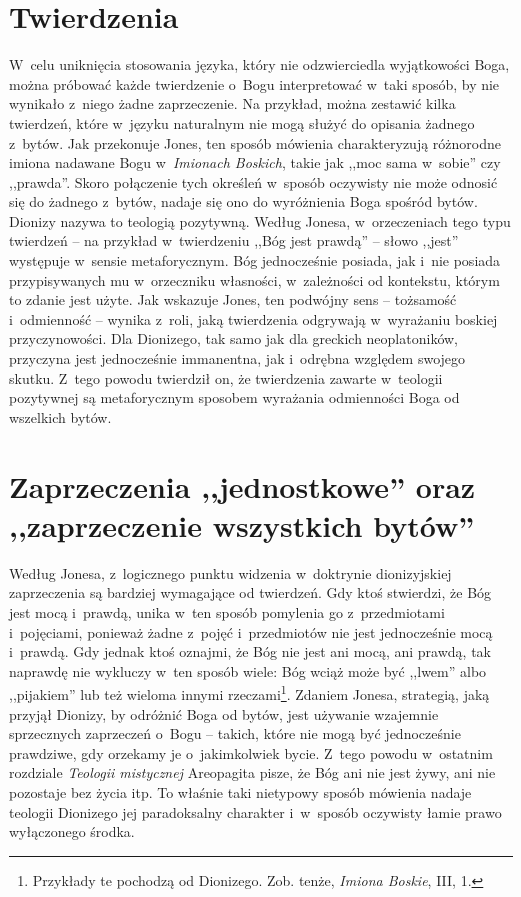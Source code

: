 \section{Twierdzenia}

W~celu uniknięcia stosowania języka, który nie odzwierciedla wyjątkowości Boga, można próbować każde twierdzenie o~Bogu interpretować w~taki sposób, by nie wynikało z~niego żadne zaprzeczenie. Na przykład, można zestawić kilka twierdzeń, które w~języku naturalnym nie mogą służyć do opisania żadnego z~bytów. Jak przekonuje Jones, ten sposób mówienia charakteryzują różnorodne imiona nadawane Bogu w~\textit{Imionach Boskich}, takie jak ,,moc sama w~sobie'' czy ,,prawda''. Skoro połączenie tych określeń w~sposób oczywisty nie może odnosić się do żadnego z~bytów, nadaje się ono do wyróżnienia Boga spośród bytów. Dionizy nazywa to teologią pozytywną. Według Jonesa, w~orzeczeniach tego typu twierdzeń -- na przykład w~twierdzeniu ,,Bóg jest prawdą'' -- słowo ,,jest'' występuje w~sensie metaforycznym. Bóg jednocześnie posiada, jak i~nie posiada przypisywanych mu w~orzeczniku własności, w~zależności od kontekstu, którym to zdanie jest użyte. Jak wskazuje Jones, ten podwójny sens -- tożsamość i~odmienność -- wynika z~roli, jaką twierdzenia odgrywają w~wyrażaniu boskiej przyczynowości. Dla Dionizego, tak samo jak dla greckich neoplatoników, przyczyna jest jednocześnie immanentna, jak i~odrębna względem swojego skutku. Z~tego powodu twierdził on, że twierdzenia zawarte w~teologii pozytywnej są metaforycznym sposobem wyrażania odmienności Boga od wszelkich bytów.


\section{Zaprzeczenia ,,jednostkowe'' oraz ,,zaprzeczenie wszystkich bytów''}

Według Jonesa, z~logicznego punktu widzenia w~doktrynie dionizyjskiej zaprzeczenia są bardziej wymagające od twierdzeń. Gdy ktoś stwierdzi, że Bóg jest mocą i~prawdą, unika w~ten sposób pomylenia go z~przedmiotami i~pojęciami, ponieważ żadne z~pojęć i~przedmiotów nie jest jednocześnie mocą i~prawdą. Gdy jednak ktoś oznajmi, że Bóg nie jest ani mocą, ani prawdą, tak naprawdę nie wykluczy w~ten sposób wiele: Bóg wciąż może być ,,lwem'' albo ,,pijakiem'' lub też wieloma innymi rzeczami\footnote{Przykłady te pochodzą od Dionizego. Zob. tenże, \textit{Imiona Boskie}, III, 1.}. Zdaniem Jonesa, strategią, jaką przyjął Dionizy, by odróżnić Boga od bytów, jest używanie wzajemnie sprzecznych zaprzeczeń o~Bogu -- takich, które nie mogą być jednocześnie prawdziwe, gdy orzekamy je o~jakimkolwiek bycie. Z~tego powodu w~ostatnim rozdziale \textit{Teologii mistycznej} Areopagita pisze, że Bóg ani nie jest żywy, ani nie pozostaje bez życia itp. To właśnie taki nietypowy sposób mówienia nadaje teologii Dionizego jej paradoksalny charakter i~w~sposób oczywisty łamie prawo wyłączonego środka.

